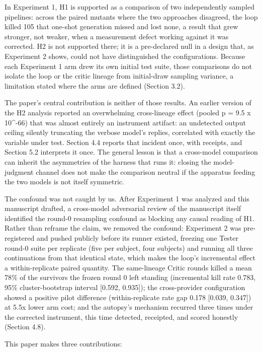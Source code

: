 \documentclass[
  11pt,
]{article}
\newcounter{none} %
\begin{document}
In Experiment 1, H1 is supported as a comparison of two independently
sampled pipelines: across the paired mutants where the two approaches
disagreed, the loop killed 105 that one-shot generation missed and lost
none, a result that grew stronger, not weaker, when a measurement defect
working against it was corrected. H2 is not supported there; it is a
pre-declared null in a design that, as Experiment 2 shows, could not
have distinguished the configurations. Because each Experiment 1 arm
drew its own initial test suite, those comparisons do not isolate the
loop or the critic lineage from initial-draw sampling variance, a
limitation stated where the arms are defined (Section 3.2).

The paper's central contribution is neither of those results. An earlier
version of the H2 analysis reported an overwhelming cross-lineage effect
(pooled p = 9.5 x 10\^{}-66) that was almost entirely an instrument
artifact: an undetected output ceiling silently truncating the verbose
model's replies, correlated with exactly the variable under test.
Section 4.4 reports that incident once, with receipts, and Section 5.2
interprets it once. The general lesson is that a cross-model comparison
can inherit the asymmetries of the harness that runs it: closing the
model-judgment channel does not make the comparison neutral if the
apparatus feeding the two models is not itself symmetric.

The confound was not caught by us. After Experiment 1 was analyzed and
this manuscript drafted, a cross-model adversarial review of the
manuscript itself identified the round-0 resampling confound as blocking
any causal reading of H1. Rather than reframe the claim, we removed the
confound: Experiment 2 was pre-registered and pushed publicly before its
runner existed, freezing one Tester round-0 suite per replicate (five
per subject, four subjects) and running all three continuations from
that identical state, which makes the loop's incremental effect a
within-replicate paired quantity. The same-lineage Critic rounds killed
a mean 78\% of the survivors the frozen round 0 left standing
(incremental kill rate 0.783, 95\% cluster-bootstrap interval {[}0.592,
0.935{]}); the cross-provider configuration showed a positive pilot
difference (within-replicate rate gap 0.178 {[}0.039, 0.347{]}) at 5.5x
lower arm cost; and the autopsy's mechanism recurred three times under
the corrected instrument, this time detected, receipted, and scored
honestly (Section 4.8).

This paper makes three contributions:
\end{document}
